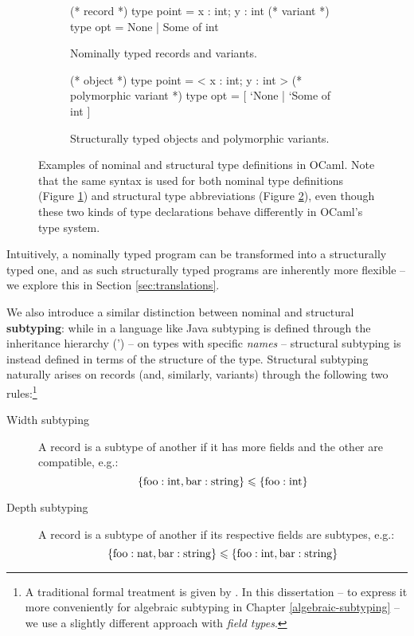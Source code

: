 \begin{figure}
    \centering
    \begin{subfigure}{.49\textwidth}
    \centering
    \begin{ocaml}
(* record *)
type point = { x : int; y : int }
(* variant *)
type opt = None | Some of int
    \end{ocaml}
    \caption{Nominally typed records and variants.}
    \label{subfig:nominal-ocaml}
    \end{subfigure}
    \hfill
    \begin{subfigure}{.49\textwidth}
    \centering
    \begin{ocaml}
(* object *)
type point = < x : int; y : int >
(* polymorphic variant *)
type opt = [ `None | `Some of int ]
    \end{ocaml}
    \caption{Structurally typed objects and polymorphic variants.}
    \label{subfig:structural-ocaml}
    \end{subfigure}
    \caption{Examples of nominal and structural type definitions in OCaml. Note that the same syntax is used for both nominal type definitions (Figure \ref{subfig:nominal-ocaml}) and structural type abbreviations (Figure \ref{subfig:structural-ocaml}), even though these two kinds of type declarations behave differently in OCaml's type system.}
    \label{fig:nominal-and-structural-ocaml}
\end{figure}

Intuitively, a nominally typed program can be transformed into a structurally typed one, and as such structurally typed programs are inherently more flexible -- we explore this in Section \ref{sec:translations}. 

We also introduce a similar distinction between nominal and structural \textbf{subtyping}: while in a language like Java subtyping is defined through the inheritance hierarchy (') -- on types with specific \emph{names} -- structural subtyping is instead defined in terms of the structure of the type. Structural subtyping naturally arises on records (and, similarly, variants) through the following two rules:\footnote{A traditional formal treatment is given by \textcite{tapl}. In this dissertation -- to express it more conveniently for algebraic subtyping in Chapter \ref{algebraic-subtyping} -- we use a slightly different approach with \emph{field types}.}
\begin{description}
    \item[Width subtyping] A record is a subtype of another if it has more fields and the other are compatible, e.g.: $$ \{ \mathrm{foo} : \mathrm{int}, \mathrm{bar} : \mathrm{string} \} \leqslant \{ \mathrm{foo} : \mathrm{int} \} $$
    \item[Depth subtyping] A record is a subtype of another if its respective fields are subtypes, e.g.:
    $$ \{ \mathrm{foo}: \mathrm{nat}, \mathrm{bar}: \mathrm{string} \} \leqslant \{ \mathrm{foo}: \mathrm{int}, \mathrm{bar}: \mathrm{string} \} $$
\end{description}

